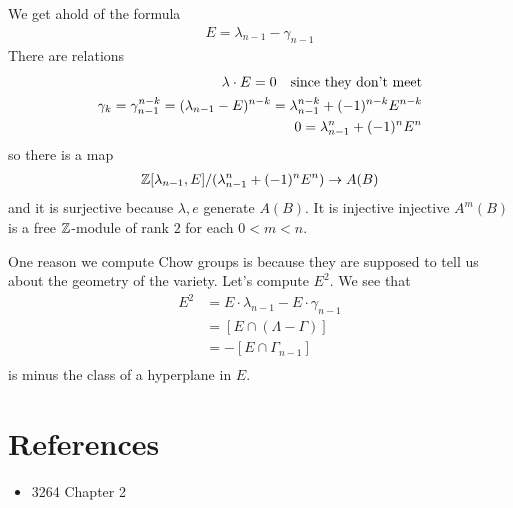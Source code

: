 \documentclass[12pt]{article}
\begin{document}
\begin{example}
    We get ahold of the formula \begin{align*}
        E = \lambda_{n-1} - \gamma_{n-1}
    \end{align*} There are relations \begin{align}
        \lambda \cdot E = 0 \text{\quad since they don't meet} \\
        \gamma_k = \gamma^{n-k}_{n-1} = (\lambda_{n-1} - E)^{n-k} = \lambda_{n-1}^{n-k} + (-1)^{n-k}E^{n-k} \\
        0 = \lambda_{n-1}^n + (-1)^nE^n
    \end{align}
    so there is a map \begin{align*}
        \mathbb{Z}[\lambda_{n-1},E]/(\lambda_{n-1}^n + (-1)^nE^n) \to A(B)
    \end{align*} and it is surjective because $\lambda,e$ generate $A(B)$.
    It is injective injective $A^m(B)$ is a free $\mathbb{Z}$-module of rank $2$ for each $0<m<n$.

    \hfill

    One reason we compute Chow groups is because they are supposed to tell us about 
    the geometry of the variety. Let's compute $E^2$. We see that \begin{align*}
        E^2 &= E\cdot \lambda_{n-1} - E\cdot \gamma_{n-1} \\
        &= [E\cap (\Lambda - \Gamma)] \\
        &= -[E\cap \Gamma_{n-1}] \\
    \end{align*} is minus the class of a hyperplane in $E$.
\end{example}

\section{References}
\begin{itemize}
    \item 3264 Chapter 2
\end{itemize}
\end{document}
